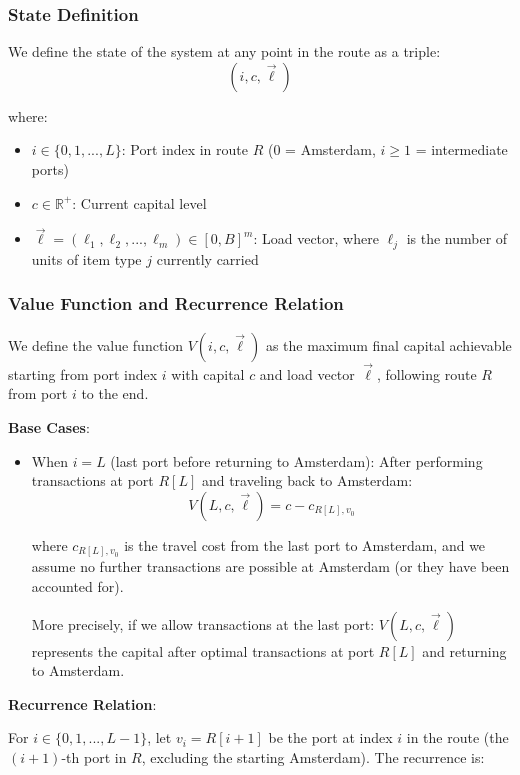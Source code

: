 \documentclass[12pt]{article}
\begin{document}
\subsubsection{State Definition}

We define the state of the system at any point in the route as a triple:
$$(i, c, \vec{\ell})$$

where:
\begin{itemize}
    \item $i \in \{0, 1, ..., L\}$: Port index in route $R$ (0 = Amsterdam, $i \geq 1$ = intermediate ports)
    \item $c \in \mathbb{R}^+$: Current capital level
    \item $\vec{\ell} = (\ell_1, \ell_2, ..., \ell_m) \in [0, B]^m$: Load vector, where $\ell_j$ is the number of units of item type $j$ currently carried
\end{itemize}

\subsubsection{Value Function and Recurrence Relation}

We define the value function $V(i, c, \vec{\ell})$ as the maximum final capital achievable starting from port index $i$ with capital $c$ and load vector $\vec{\ell}$, following route $R$ from port $i$ to the end.

\textbf{Base Cases}:
\begin{itemize}
    \item When $i = L$ (last port before returning to Amsterdam): After performing transactions at port $R[L]$ and traveling back to Amsterdam:
    $$V(L, c, \vec{\ell}) = c - c_{R[L], v_0}$$
    
    where $c_{R[L], v_0}$ is the travel cost from the last port to Amsterdam, and we assume no further transactions are possible at Amsterdam (or they have been accounted for).
    
    More precisely, if we allow transactions at the last port: $V(L, c, \vec{\ell})$ represents the capital after optimal transactions at port $R[L]$ and returning to Amsterdam.
\end{itemize}

\textbf{Recurrence Relation}:

For $i \in \{0, 1, ..., L-1\}$, let $v_i = R[i+1]$ be the port at index $i$ in the route (the $(i+1)$-th port in $R$, excluding the starting Amsterdam). The recurrence is:
\end{document}
